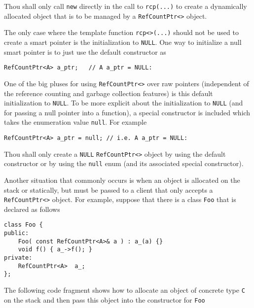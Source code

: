 \begin{commandment}\label{rcp:cmd:rcp-new}
Thou shall only call {}\texttt{new} directly
in the call to {}\texttt{rcp(...)} to create a dynamically allocated
object that is to be managed by a {}\texttt{RefCountPtr<>} object.
\end{commandment}

The only case where the template function {}\texttt{rcp<>(...)} should
not be used to create a smart pointer is the initialization to
{}\texttt{NULL}.  One way to initialize a null smart pointer is to just
use the default constructor as

{\scriptsize\begin{verbatim}
RefCountPtr<A> a_ptr;   // A a_ptr = NULL:
\end{verbatim}}

One of the big pluses for using {}\texttt{RefCountPtr<>} over raw
pointers (independent of the reference counting and garbage collection
features) is this default initialization to {}\texttt{NULL}.
To be more explicit about the initialization to {}\texttt{NULL} (and for
passing a null pointer into a function), a special constructor is
included which takes the enumeration value {}\texttt{null}.  For example

{\scriptsize\begin{verbatim}
RefCountPtr<A> a_ptr = null; // i.e. A a_ptr = NULL:
\end{verbatim}}

\begin{commandment}
Thou shall only create a {}\texttt{NULL} {}\texttt{RefCountPtr<>}
object by using the default constructor or by using the
{}\texttt{null} enum (and its associated special constructor).
\end{commandment}

Another situation that commonly occurs is when an object is allocated
on the stack or statically, but must be passed to a client that only
accepts a {}\texttt{RefCountPtr<>} object.  For example, suppose that
there is a class {}\texttt{Foo} that is declared as follows

{\scriptsize\begin{verbatim}
class Foo {
public:
    Foo( const RefCountPtr<A>& a ) : a_(a) {}
    void f() { a_->f(); }
private:
    RefCountPtr<A>  a_;
};
\end{verbatim}}

The following code fragment shows how to allocate an object of concrete
type {}\texttt{C} on the stack and then pass this object into the constructor
for {}\texttt{Foo}

